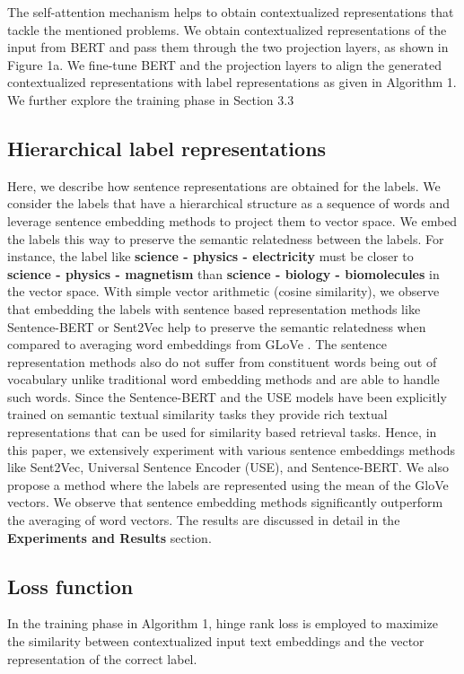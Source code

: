 \documentclass[runningheads, envcountsame, a4paper]{llncs}
\begin{document}
The self-attention mechanism helps to obtain contextualized representations that tackle the mentioned problems. We obtain contextualized representations of the input from BERT and pass them through the two projection layers, as shown in Figure 1a. We fine-tune BERT and the projection layers to align the generated contextualized representations with label representations as given in Algorithm 1. We further explore the training phase in Section 3.3

\subsection{Hierarchical label representations}
Here, we describe how sentence representations are obtained for the labels. We consider the labels that have a hierarchical structure as a sequence of words and leverage sentence embedding methods to project them to vector space. We embed the labels this way to preserve the semantic relatedness between the labels. For instance, the label like \textbf{science - physics - electricity} must be closer to \textbf{science - physics - magnetism} than \textbf{science - biology - biomolecules} in the vector space. With simple vector arithmetic (cosine similarity), we observe that embedding the labels with sentence based representation methods like Sentence-BERT or Sent2Vec help to preserve the semantic relatedness when compared to averaging word embeddings from GLoVe \cite{pennington-etal-2014-glove}. The sentence representation methods also do not suffer from constituent words being out of vocabulary unlike traditional word embedding methods and are able to handle such words. Since the Sentence-BERT and the USE models have been explicitly trained on semantic textual similarity tasks they provide rich textual representations that can be used for similarity based retrieval tasks. Hence, in this paper, we extensively experiment with various sentence embeddings methods like Sent2Vec, Universal Sentence Encoder (USE), and Sentence-BERT. We also propose a method where the labels are represented using the mean of the  GloVe vectors. We observe that sentence embedding methods significantly outperform the averaging of word vectors. The results are discussed in detail in the \textbf{Experiments and Results} section.

\subsection{Loss function}
In the training phase in Algorithm 1,  hinge rank loss is employed to maximize the similarity between contextualized input text embeddings and the vector representation of the correct label.
\end{document}
